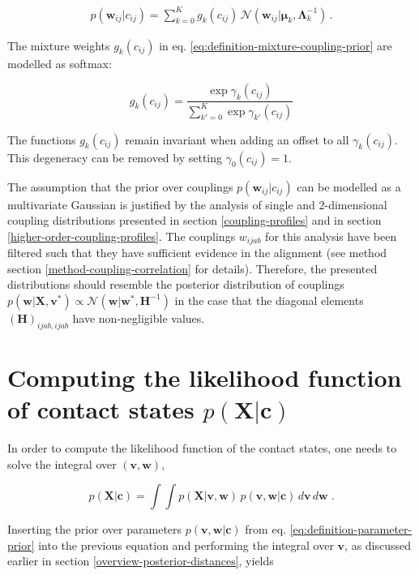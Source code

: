 \documentclass[11pt,a4paper,twoside]{book}
\newcommand{\Gauss}{\mathcal{N}}
\renewcommand{\H}{\mathbf{H}}
\newcommand{\Lk}{\mathbf{\Lambda}_k}
\newcommand{\muk}{\mathbf{\mu}_k}
\renewcommand{\c}{\mathbf{c}}
\newcommand{\cij}{c_{ij}}
\renewcommand{\v}{\mathbf{v}}
\newcommand{\w}{\mathbf{w}}
\newcommand{\wij}{\mathbf{w}_{ij}}
\newcommand{\wijab}{w_{ijab}}
\newcommand{\X}{\mathbf{X}}
\theoremstyle{definition}
\theoremstyle{definition}
\theoremstyle{remark}
\begin{document}
\begin{align}   
      p(\wij | \cij) = \sum_{k=0}^K g_k(\cij) \, \Gauss(\wij | \muk, \Lk^{-1}) \,.
\label{eq:definition-mixture-coupling-prior}
\end{align}

The mixture weights \(g_k(\cij)\) in eq.
\eqref{eq:definition-mixture-coupling-prior} are modelled as softmax:

\begin{equation}
    g_k(\cij) = \frac{\exp \gamma_k(\cij)}{\sum_{k'=0}^K \exp \gamma_{k'}(\cij)} 
\label{eq:def-g-k-binary}
\end{equation}

The functions \(g_k(\cij)\) remain invariant when adding an offset to
all \(\gamma_k(\cij)\). This degeneracy can be removed by setting
\(\gamma_0(\cij)=1\).

The assumption that the prior over couplings \(p(\wij|\cij)\) can be
modelled as a multivariate Gaussian is justified by the analysis of
single and 2-dimensional coupling distributions presented in section
\ref{coupling-profiles} and in section
\ref{higher-order-coupling-profiles}. The couplings \(\wijab\) for this
analysis have been filtered such that they have sufficient evidence in
the alignment (see method section \ref{method-coupling-correlation} for
details). Therefore, the presented distributions should resemble the
posterior distribution of couplings
\(p(\w | \X , \v^*) \propto \Gauss (\w | \w^*, \H^{-1})\) in the case
that the diagonal elements \((\H)_{ijab, ijab}\) have non-negligible
values.

\section{\texorpdfstring{Computing the likelihood function of contact
states
\(p(\X | \c)\)}{Computing the likelihood function of contact states p(\textbackslash{}X \textbar{} \textbackslash{}c)}}\label{likelihood-fct-distances}

In order to compute the likelihood function of the contact states, one
needs to solve the integral over \((\v, \w)\),

\begin{equation}
    p(\X | \c) = \int \int p(\X | \v,\w) \, p(\v, \w | \c) \,d\v\,d\w \; .
\label{eq:likelihood-distances}
\end{equation}

Inserting the prior over parameters \(p(\v, \w | \c)\) from eq.
\eqref{eq:definition-parameter-prior} into the previous equation and
performing the integral over \(\v\), as discussed earlier in section
\ref{overview-posterior-distances}, yields
\end{document}
